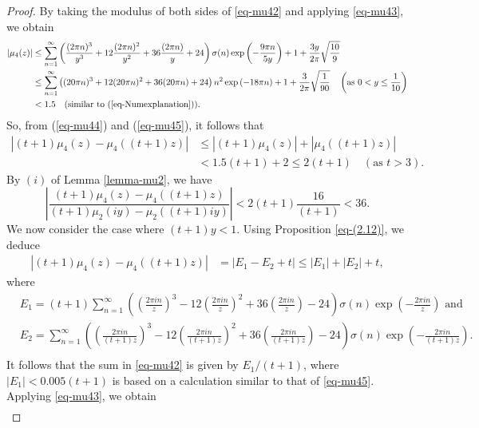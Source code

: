 \documentclass[11pt]{amsart}
\theoremstyle{plain}
\numberwithin{equation}{section}
\begin{document}
\begin{proof}
			By taking the modulus of both sides of \eqref{eq-mu42} and applying \eqref{eq-mu43}, we obtain
			\begin{align}\label{eq-mu45}
				\notag
				|\mu_{4}(z)|
				&\le\sum_{n=1}^{\infty}\left(\frac{(2\pi n)^{3}}{y^{3}}+12\frac{(2\pi n)^{2}}{y^{2}}+36\frac{(2\pi n)}{y}+24\right)\sigma(n)\exp\left(-\frac{9\pi n}{5y}\right)+1+\frac{3y}{2\pi}\sqrt{\frac{10}{9}}\\
				\notag
				&\le\sum_{n=1}^{\infty}\left((20\pi n)^{3}+12(20\pi n)^{2}+36(20\pi n)+24\right)n^{2}\exp\left(-18\pi n\right)+1+\frac{3}{2\pi}\sqrt{\frac{1}{90}}\quad\left(\text{as $0<y\le \frac{1}{10}$}\right)\\
				&<1.5 \quad (\text{similar to (\ref{eq-Numexplanation})}).
			\end{align}
			So, from (\ref{eq-mu44}) and (\ref{eq-mu45}), it follows that
			\begin{align*}
				|(t+1)\mu_{4}(z)-\mu_{4}((t+1)z)|&\le |(t+1)\mu_{4}(z)|+|\mu_{4}((t+1)z)|\\&<1.5(t+1)+2\le2(t+1)\quad(\text{as $t>3$}).   
			\end{align*}
			By $(i)$ of Lemma \ref{lemma-mu2}, we have
			\begin{equation*}
				\left|\frac{(t+1)\mu_{4}(z)-\mu_{4}((t+1)z)}{(t+1)\mu_{2}(iy)-\mu_{2}((t+1)iy)}\right|<2(t+1)\frac{16}{(t+1)}<36.    
			\end{equation*}
			We now consider the case where $(t+1)y<1.$ Using Proposition \ref{eq-(2.12)}, we deduce
			\begin{align}\label{eq-mu46}
				|(t+1)\mu_{4}(z)-\mu_{4}((t+1)z)|&= |E_1-E_2+t|\le |E_1|+|E_2|+t,
			\end{align}
			where
			\begin{align*}
				&E_{1}=(t+1)\sum_{n=1}^{\infty}\left(\left(\frac{2\pi in}{z}\right)^{3}-12\left(\frac{2\pi in}{z}\right)^{2}+36\left(\frac{2\pi in}{z}\right)-24\right)\sigma(n)\exp\left(-\frac{2\pi in}{z}\right)\,\,\text{and  }\\
				&E_2= \sum_{n=1}^{\infty}\left(\left(\frac{2\pi in}{(t+1)z}\right)^{3}-12\left(\frac{2\pi in}{(t+1)z}\right)^{2}+36\left(\frac{2\pi in}{(t+1)z}\right)-24\right)\sigma(n)\exp\left(-\frac{2\pi in}{(t+1)z}\right).\\
			\end{align*}
			It follows that the sum in \eqref{eq-mu42} is given by $E_1/(t+1)$, where $|E_{1}| < 0.005(t+1)$ is based on a calculation similar to that of \eqref{eq-mu45}. Applying \eqref{eq-mu43}, we obtain
			\begin{align*}

\end{align*}
\end{proof}
\end{document}
